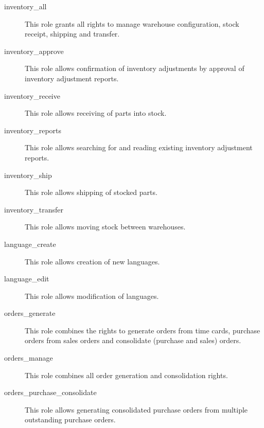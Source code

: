 \begin{description}
\item [inventory\_all] \htmlspacing 
                         This role grants all rights to manage warehouse configuration, stock receipt, shipping and transfer.
\item [inventory\_approve] \htmlspacing 
                         This role allows confirmation of inventory adjustments by approval of inventory adjustment reports.
\item [inventory\_receive] \htmlspacing 
                         This role allows receiving of parts into stock.
\item [inventory\_reports] \htmlspacing 
                         This role allows searching for and reading existing inventory adjustment reports.
\item [inventory\_ship] \htmlspacing 
                         This role allows shipping of stocked parts.
\item [inventory\_transfer] \htmlspacing 
                         This role allows moving stock between warehouses.
\item [language\_create] \htmlspacing 
                         This role allows creation of new languages.
\item [language\_edit] \htmlspacing 
                         This role allows modification of languages.
\item [orders\_generate] \htmlspacing 
                         This role combines the rights to generate orders from
                         time cards, purchase orders from sales orders
                         and consolidate (purchase and sales) orders.
\item [orders\_manage] \htmlspacing 
                         This role combines all order generation and
                         consolidation rights.
\item [orders\_purchase\_consolidate] \htmlspacing 
                         This role allows generating consolidated purchase
                         orders from multiple outstanding purchase orders.

\end{description}
